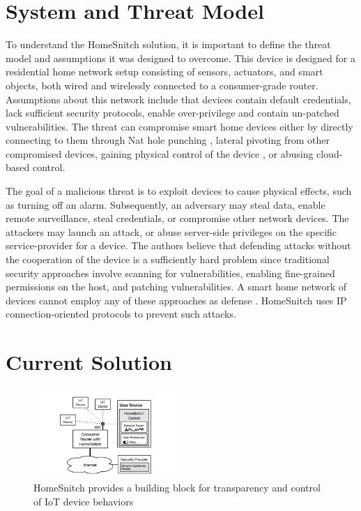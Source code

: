 \section{System and Threat Model}
\label{sec:related}
To understand the HomeSnitch solution, it is important to define the threat model and assumptions it was designed to overcome. This device is designed for a residential home network setup consisting of sensors, actuators, and smart objects, both wired and wirelessly connected to a consumer-grade router.  Assumptions about this network include that devices contain default credentials, lack sufficient security protocols, enable over-privilege and contain un-patched vulnerabilities. The threat can compromise smart home devices either by directly connecting to them through Nat hole punching \cite{Vijay}, lateral pivoting from other compromised devices, gaining physical control of the device \cite{Nitesh}, or abusing cloud-based control. 

The goal of a malicious threat is to exploit devices to cause physical effects, such as turning off an alarm. Subsequently, an adversary may steal data, enable remote surveillance, steal credentials, or compromise other network devices. The attackers may launch an attack, or abuse server-side privileges on the specific service-provider for a device. The authors believe that defending attacks without the cooperation of the device is a sufficiently hard problem since traditional security approaches involve scanning for vulnerabilities, enabling fine-grained permissions on the host, and patching vulnerabilities. A smart home network of devices cannot employ any of these approaches as defense \cite{Enck}. HomeSnitch uses IP connection-oriented protocols to prevent such attacks. 

\section{Current Solution}
\begin{figure}[h]
\centering
\includegraphics[width=0.5\textwidth]{Figure 1.PNG}
\caption{HomeSnitch provides a building block for transparency and control of IoT device behaviors \cite{Enck}}
\label{fig:example}
\end{figure}



